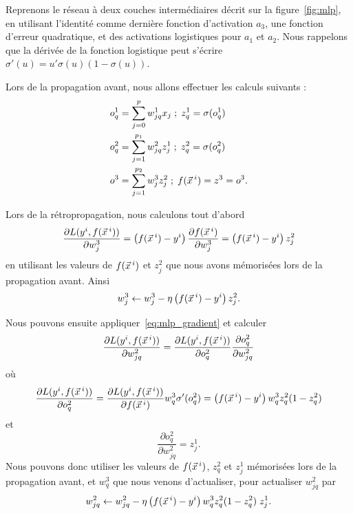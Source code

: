 \begin{exemple}
  Reprenons le réseau à deux couches intermédiaires décrit sur la
  figure~\ref{fig:mlp}, en utilisant l'identité comme dernière fonction
  d'activation $a_3$, une fonction d'erreur quadratique, et des activations
  logistiques pour $a_1$ et $a_2$. Nous rappelons que la dérivée de la
  fonction logistique peut s'écrire $\sigma'(u) = u' \sigma(u) (1 -
  \sigma(u))$.
  
  Lors de la propagation avant, nous allons effectuer les calculs suivants :
  \begin{align*}
    o^1_q & = \sum_{j=0}^p w_{jq}^1 x_j \; ; \; z^1_q = \sigma(o^1_q) \\
    o^2_q & = \sum_{j=1}^{p_1} w_{jq}^2 z^1_j \; ; \; z^2_q = \sigma(o^2_q) \\
    o^3 & = \sum_{j=1}^{p_2} w^3_j z^2_j \; ; \; f(\xx^i) = z^3 = o^3.
  \end{align*}
  
  Lors de la rétropropagation, nous calculons tout d'abord 
  \begin{equation*}
    \frac{\partial L(y^i, f(\xx^i))}{\partial w^3_j} =      
    \left(f(\xx^i) - y^i \right) \frac{\partial f(\xx^i)}{\partial w^3_j} =
    \left(f(\xx^i) - y^i \right) z^2_j
  \end{equation*}
  en utilisant les valeurs de $f(\xx^i)$ et $z^2_j$ que nous avons mémorisées
  lors de la propagation avant. Ainsi
  \begin{equation*}
    w^3_j \leftarrow w^3_j - \eta \left(f(\xx^i) - y^i \right) z^2_j.
  \end{equation*}
  
  Nous pouvons ensuite appliquer~\ref{eq:mlp_gradient} et calculer 
  \begin{equation*}
    \frac{\partial L(y^i, f(\xx^i))}{\partial w^2_{jq}}  =      
    \frac{\partial L(y^i, f(\xx^i))}{\partial o^2_q} 
    \frac{\partial o^2_q}{\partial w^2_{jq}} 
  \end{equation*}
  où 
  \begin{equation}
    \label{eq:backprop_layer2}
    \frac{\partial L(y^i, f(\xx^i))}{\partial o^2_q} =      
    \frac{\partial L(y^i, f(\xx^i))}{\partial f(\xx^i)} w^3_q \sigma'(o^2_q) = 
    \left(f(\xx^i) - y^i \right) w^3_q z^2_q (1-z^2_q)
  \end{equation}
  et 
  \begin{equation*}
    \frac{\partial o^2_q}{\partial w^2_{jq}} = z^1_j.
  \end{equation*}
  Nous pouvons donc utiliser les valeurs de $f(\xx^i)$, $z^2_q$ et $z^1_j$
  mémorisées lors de la propagation avant, et $w^3_q$ que nous venons
  d'actualiser, pour actualiser $w^2_{jq}$ par
  \begin{equation*}
    w^2_{jq} \leftarrow w^2_{jq} - \eta \left(f(\xx^i) - y^i \right) 
    w^3_q z^2_q (1-z^2_q) \; z^1_j.
  \end{equation*}
  

\end{exemple}
